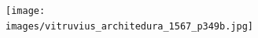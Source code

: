 \documentclass[a4paper, 12pt]{article}
\begin{document}






\begin{figure}[H]
    \centering
    \begin{subfigure}{.45\textwidth}
        \centering
        \texttt{[image: images/vitruvius\_architedura\_1567\_p349b.jpg]}

\end{subfigure}
\end{figure}
\end{document}
